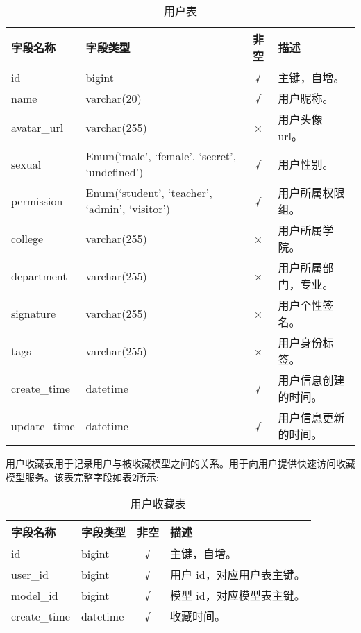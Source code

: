 \begin{table}[H]
  \centering
  \small
  \caption{用户表}
  \label{table:用户表}
  \setlength{\tabcolsep}{4.2mm}
  \begin{tabular}{l|l|c|l}
    \toprule
    \textbf{字段名称} & \textbf{字段类型} & \textbf{非空} & \textbf{描述} \\
    \midrule
    id & bigint & √ & 主键，自增。 \\
    name & varchar(20) & √ & 用户昵称。 \\
    avatar\_url & varchar(255) & × & 用户头像 url。 \\
    sexual & Enum(`male', `female', `secret', `undefined') & √ & 用户性别。 \\
    permission & Enum(`student', `teacher', `admin', `visitor') & √ & 用户所属权限组。 \\ 
    college & varchar(255) & × & 用户所属学院。 \\
    department & varchar(255) & × & 用户所属部门，专业。 \\
    signature & varchar(255) & × & 用户个性签名。 \\
    tags & varchar(255) & × & 用户身份标签。 \\
    create\_time & datetime & √ & 用户信息创建的时间。 \\
    update\_time & datetime & √ & 用户信息更新的时间。 \\
    \bottomrule
  \end{tabular}
\end{table}

用户收藏表用于记录用户与被收藏模型之间的关系。用于向用户提供快速访问收藏模型服务。该表完整字段如表\ref{table:用户收藏表}所示:

\begin{table}[H]
  \centering
  \small
  \caption{用户收藏表}
  \label{table:用户收藏表}
  \setlength{\tabcolsep}{9mm}
  \begin{tabular}{l|l|c|l}
    \toprule
    \textbf{字段名称} & \textbf{字段类型} & \textbf{非空} & \textbf{描述} \\
    \midrule
    id & bigint & √ & 主键，自增。 \\
    user\_id & bigint & √ & 用户 id，对应用户表主键。 \\
    model\_id & bigint & √ & 模型 id，对应模型表主键。 \\
    create\_time & datetime & √ & 收藏时间。 \\
    \bottomrule
  \end{tabular}
\end{table}

